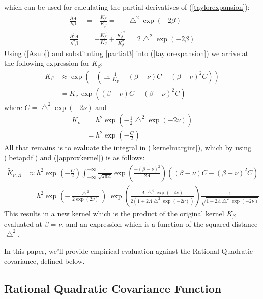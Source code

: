 \documentclass{article}
\newcommand{\tK}{\tilde{K}}
\begin{document}
which can be used for calculating the partial derivatives of (\ref{taylorexpansion}):
\begin{align}
\frac{\partial{A}}{\partial{\beta}} &= -\frac{K^\prime_\beta}{K_\beta} = \; -\bigtriangleup^2 \exp(-2\beta) \label{partial2}\\
\frac{\partial^2{A}}{\partial^2{\beta}} &= -\frac{K^{\prime\prime}_\beta}{K_\beta} + \frac{{K^\prime_\beta}^2}{K_\beta^2} = \; 2 \bigtriangleup^2 \exp(-2\beta) \label{partial3}
\end{align}
Using (\ref{Asub}) and substituting \ref{partial3} into (\ref{taylorexpansion}) we arrive at the following expression for $K_\beta$:
\begin{align}
K_\beta &\approx \exp \left(-\left( \ln \frac{1}{K_{\nu}} - (\beta-\nu) C + (\beta-\nu)^2 C \right)   \right) \nonumber\\
&= K_{\nu} \, \exp \left( (\beta-\nu) C - (\beta-\nu)^2 C \right) \label{approxkernel}
\end{align}
where $C = \bigtriangleup^2 \exp(-2\nu)$ and
\begin{align}
K_{\nu} &= h^2 \exp\left( -\frac{1}{2}\bigtriangleup^2 \exp(-2\nu) \right) \nonumber\\
&= h^2 \exp\left( -\frac{C}{2} \right)
\end{align}
All that remains is to evaluate the integral in (\ref{kernelmargint}), which by using (\ref{betapdf}) and (\ref{approxkernel}) is as follows:
\begin{align}
\tK_{\nu,\Lambda} &\approx h^2 \exp\left( -\frac{C}{2} \right)\int_{-\infty}^{+\infty} \frac{1}{\sqrt{2 \pi \Lambda}} \exp \left( \frac{ -(\beta - \nu)^2}{2\Lambda} \right) \left( (\beta-\nu) C - (\beta-\nu)^2 C \right) \nonumber \\
&= h^2 \exp\left( -\frac{\bigtriangleup^2 }{2\exp(2\nu)} \right) \; \exp \left( \frac{\Lambda\, \bigtriangleup^4\exp(-4\nu)}{2(1+2\Lambda \bigtriangleup^2 \exp(-2\nu))} \right) \frac{1}{\sqrt{1+ 2\Lambda \bigtriangleup^2\exp(-2\nu)}}
\end{align}
This results in a new kernel which is the product of the original kernel $K_\beta$ evaluated at $\beta=\nu$, and an expression which is a function of the squared distance $ \bigtriangleup^2$. 

In this paper, we'll provide empirical evaluation against the Rational Quadratic covariance, defined below.

\subsection{Rational Quadratic Covariance Function} 
\end{document}
